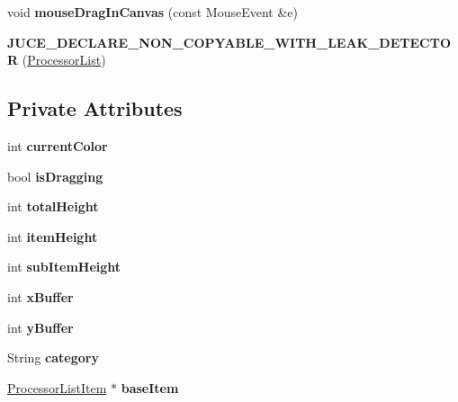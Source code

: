 \begin{DoxyCompactItemize}
\item 
\hypertarget{classProcessorList_a2597d2a52f8ec19d4ee8a2633e6c4b51}{void {\bfseries mouse\-Drag\-In\-Canvas} (const Mouse\-Event \&e)}\label{classProcessorList_a2597d2a52f8ec19d4ee8a2633e6c4b51}

\item 
\hypertarget{classProcessorList_a44cc07fd66600b293ade3b958350bc62}{{\bfseries J\-U\-C\-E\-\_\-\-D\-E\-C\-L\-A\-R\-E\-\_\-\-N\-O\-N\-\_\-\-C\-O\-P\-Y\-A\-B\-L\-E\-\_\-\-W\-I\-T\-H\-\_\-\-L\-E\-A\-K\-\_\-\-D\-E\-T\-E\-C\-T\-O\-R} (\hyperlink{classProcessorList}{Processor\-List})}\label{classProcessorList_a44cc07fd66600b293ade3b958350bc62}

\end{DoxyCompactItemize}
\subsection*{Private Attributes}
\begin{DoxyCompactItemize}
\item 
\hypertarget{classProcessorList_aa15bd6fc784ec300c409591d85dc1e72}{int {\bfseries current\-Color}}\label{classProcessorList_aa15bd6fc784ec300c409591d85dc1e72}

\item 
\hypertarget{classProcessorList_a1a341a670be20804eabb72c492b684a8}{bool {\bfseries is\-Dragging}}\label{classProcessorList_a1a341a670be20804eabb72c492b684a8}

\item 
\hypertarget{classProcessorList_a1284c3fdf5c05e58526791b4691a7c5c}{int {\bfseries total\-Height}}\label{classProcessorList_a1284c3fdf5c05e58526791b4691a7c5c}

\item 
\hypertarget{classProcessorList_a98d0271bd20252eb763df33cb2ce7867}{int {\bfseries item\-Height}}\label{classProcessorList_a98d0271bd20252eb763df33cb2ce7867}

\item 
\hypertarget{classProcessorList_af0d75f66b3b90d78db99601a69a01591}{int {\bfseries sub\-Item\-Height}}\label{classProcessorList_af0d75f66b3b90d78db99601a69a01591}

\item 
\hypertarget{classProcessorList_a7976c45e018552716dd6eba492f6b997}{int {\bfseries x\-Buffer}}\label{classProcessorList_a7976c45e018552716dd6eba492f6b997}

\item 
\hypertarget{classProcessorList_a7ff6a5a231f7b5a9f7b279334f1bd3db}{int {\bfseries y\-Buffer}}\label{classProcessorList_a7ff6a5a231f7b5a9f7b279334f1bd3db}

\item 
\hypertarget{classProcessorList_a7500fdcc9425b0bca0c2f53df2491a06}{String {\bfseries category}}\label{classProcessorList_a7500fdcc9425b0bca0c2f53df2491a06}

\item 
\hypertarget{classProcessorList_a9bd614bdd6198da16c8af8e120278912}{\hyperlink{classProcessorListItem}{Processor\-List\-Item} $\ast$ {\bfseries base\-Item}}\label{classProcessorList_a9bd614bdd6198da16c8af8e120278912}

\end{DoxyCompactItemize}

